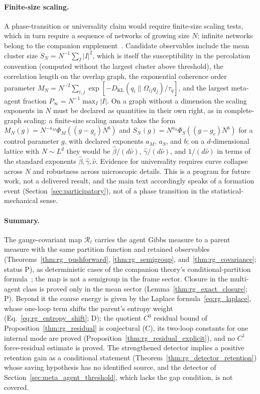 \paragraph{Finite-size scaling.}
A phase-transition or universality claim would require finite-size scaling tests, which in turn require a sequence of networks of growing size $N$; infinite networks belong to the companion supplement~\cite[Ch.~B5]{DennisGaugeVFESuppB2026}. Candidate observables include the mean cluster size $S_N = N^{-1}\sum_I |I|^2$, which is itself the susceptibility in the percolation convention (computed without the largest cluster above threshold), the correlation length on the overlap graph, the exponential coherence order parameter $M_N = N^{-2}\sum_{i,j}\exp[-D_{\mathrm{KL}}(q_i \| \Omega_{ij}q_j)/\tau_q]$, and the largest meta-agent fraction $P_\infty = N^{-1}\max_I |I|$. On a graph without a dimension the scaling exponents in $N$ must be declared as quantities in their own right, as in complete-graph scaling: a finite-size scaling ansatz takes the form $M_N(g) = N^{-a_M}\Phi_M((g - g_c)N^{b})$ and $S_N(g) = N^{a_S}\Phi_S((g - g_c)N^{b})$ for a control parameter $g$, with declared exponents $a_M$, $a_S$, and $b$; on a $d$-dimensional lattice with $N\sim L^d$ they would be $\hat{\beta}/(d\hat{\nu})$, $\hat{\gamma}/(d\hat{\nu})$, and $1/(d\hat{\nu})$ in terms of the standard exponents $\hat{\beta},\hat{\gamma},\hat{\nu}$. Evidence for universality requires curve collapse across $N$ and robustness across microscopic details. This is a program for future work, not a delivered result, and the main text accordingly speaks of a formation event (Section~\ref{sec:participatory}), not of a phase transition in the statistical-mechanical sense.

\paragraph{Summary.}
The gauge-covariant map $\mathcal{R}_\ell$ carries the agent Gibbs measure to a parent measure with the same partition function and retained observables (Theorems~\ref{thm:rg_pushforward}, \ref{thm:rg_semigroup}, and~\ref{thm:rg_covariance}; status P), as deterministic cases of the companion theory's conditional-partition formula~\cite[Chs.~9 and 11]{DennisGaugeVFE2026}; the map is not a semigroup in the frame sector. Closure in the multi-agent class is proved only in the mean sector (Lemma~\ref{thm:rg_exact_closure}; P). Beyond it the coarse energy is given by the Laplace formula~\eqref{eq:rg_laplace}, whose one-loop term shifts the parent's entropy weight (Eq.~\eqref{eq:rg_entropy_shift}; D); the quotient $C^0$ residual bound of Proposition~\ref{thm:rg_residual} is conjectural (C), its two-loop constants for one internal mode are proved (Proposition~\ref{thm:rg_residual_explicit}), and no $C^1$ force-residual estimate is proved. The strengthened detector implies a positive retention gain as a conditional statement (Theorem~\ref{thm:rg_detector_retention}) whose saving hypothesis has no identified source, and the detector of Section~\ref{sec:meta_agent_threshold}, which lacks the gap condition, is not covered.

